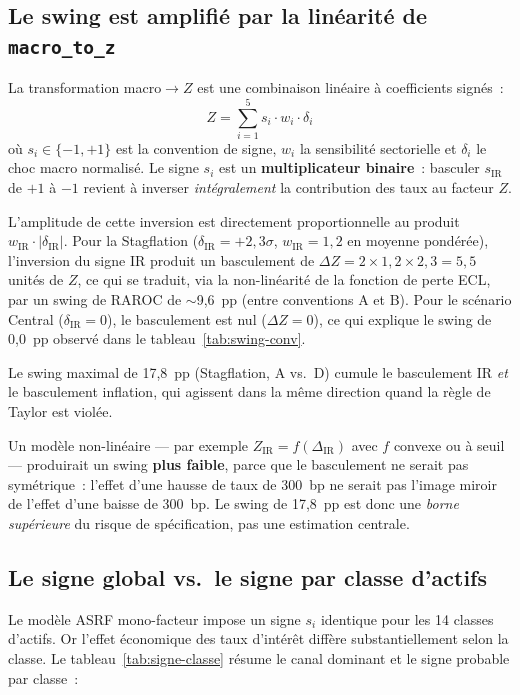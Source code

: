 \documentclass[12pt, a4paper, twoside, openright]{report}
\theoremstyle{definition}
\begin{document}
\subsection{Le swing est amplifié par la linéarité de \texttt{macro\_to\_z}}
\label{sec:conv-linearite}

La transformation macro$\to Z$ est une combinaison linéaire à coefficients signés~:
%
\begin{equation}
Z = \sum_{i=1}^{5} s_i \cdot w_i \cdot \delta_i
\label{eq:z-lineaire}
\end{equation}
%
où $s_i \in \{-1, +1\}$ est la convention de signe, $w_i$ la sensibilité sectorielle et $\delta_i$ le choc macro normalisé. Le signe $s_i$ est un \textbf{multiplicateur binaire}~: basculer $s_{\text{IR}}$ de $+1$ à $-1$ revient à inverser \emph{intégralement} la contribution des taux au facteur $Z$.

L'amplitude de cette inversion est directement proportionnelle au produit $w_{\text{IR}} \cdot |\delta_{\text{IR}}|$. Pour la Stagflation ($\delta_{\text{IR}} = +2{,}3\sigma$, $w_{\text{IR}} = 1{,}2$ en moyenne pondérée), l'inversion du signe IR produit un basculement de $\Delta Z = 2 \times 1{,}2 \times 2{,}3 = 5{,}5$ unités de $Z$, ce qui se traduit, via la non-linéarité de la fonction de perte ECL, par un swing de RAROC de $\sim$9,6~pp (entre conventions A et B). Pour le scénario Central ($\delta_{\text{IR}} = 0$), le basculement est nul ($\Delta Z = 0$), ce qui explique le swing de 0,0~pp observé dans le tableau~\ref{tab:swing-conv}.

Le swing maximal de 17,8~pp (Stagflation, A vs.\ D) cumule le basculement IR \emph{et} le basculement inflation, qui agissent dans la même direction quand la règle de Taylor est violée.

Un modèle non-linéaire --- par exemple $Z_{\text{IR}} = f(\Delta_{\text{IR}})$ avec $f$ convexe ou à seuil --- produirait un swing \textbf{plus faible}, parce que le basculement ne serait pas symétrique~: l'effet d'une hausse de taux de 300~bp ne serait pas l'image miroir de l'effet d'une baisse de 300~bp. Le swing de 17,8~pp est donc une \emph{borne supérieure} du risque de spécification, pas une estimation centrale.


\subsection{Le signe global vs.\ le signe par classe d'actifs}
\label{sec:conv-signe-global}

Le modèle ASRF mono-facteur impose un signe $s_i$ identique pour les 14 classes d'actifs. Or l'effet économique des taux d'intérêt diffère substantiellement selon la classe. Le tableau~\ref{tab:signe-classe} résume le canal dominant et le signe probable par classe~:
\end{document}
